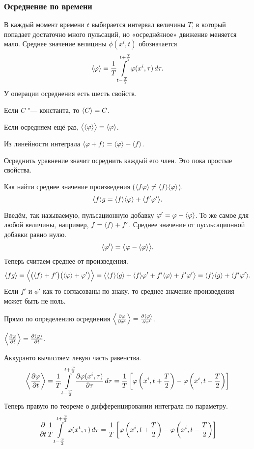 \subsubsection{Осреднение по времени}
В каждый момент времени $t$ выбирается интервал величины $T$, в который попадает достаточно много пульсаций, но «осреднённое» движение меняется мало.
Среднее значение велицины $\phi(x^i,t)$ обозначается
\[
\la \phi\ra = \frac1T\int\limits_{t-\frac T2}^{t+\frac T2}\phi(x^i,\tau)\,d\tau.
\]
У операции осреднения есть шесть свойств.
\begin{Ut}
  Если $C$ "--- константа, то $\la C\ra = C$.
\end{Ut}
\begin{Ut}
 Если осредняем ещё раз, $\big\la\la\phi\ra\big\ra = \la \phi\ra$.
\end{Ut}
\begin{Ut}
  Из линейности интеграла $\la \phi+f\ra = \la \phi\ra + \la f\ra$.
\end{Ut}
Осреднить уравнение значит осреднить каждый его член. Это пока простые свойства. 
\begin{Ut}
  Как найти среднее значение произведения ($\la f\phi\ra\ne\la f\ra \la\phi\ra$).
\[
  \MID fg = \MID f\MID \phi + \MID{f'\phi'}.
\]
\end{Ut}
\begin{Proof}
  Введём, так называемую, пульсационную добавку $\phi' = \phi-\la\phi\ra$. То же самое для любой величины, например, $f = \la f\ra +f'$. Среднее значение от пусльсационной добавки равно нулю.
\[
  \la \phi'\ra = \big\la \phi - \la \phi\ra\big\ra.
\]
Теперь считаем среднее от произведения.
\[
  \la fg\ra = \Big\la \big(\la f\ra + f'\big)\big(\la \phi\ra + \phi'\big)\Big\ra = 
 \big\la \MID f \MID g + \MID f \phi' + f'\MID \phi + f'\phi'\big\ra =
  \MID f\MID g + \MID{f'\phi'}.
\]
Если $f'$ и $\phi'$ как-то согласованы по знаку, то среднее значение произведения может быть не ноль.
\end{Proof}
\begin{Ut}
  Прямо по определению осреднения $\MID[\Big]{\CP\phi{x^i}} = \CP{\MID\phi}{x^i}$.
\end{Ut}
\begin{Ut}
  $\MID[\Big]{\CP\phi t} = \CP{\MID\phi}t$.
\end{Ut}
\begin{Proof}
  Аккуранто вычисляем левую часть равенства.
\[
  \MID[\bigg]{\CP\phi t} = \iMID T\CP{\phi(x^i,\tau)}\tau\,d\tau = 
  \frac 1T\left[\phi\left(x^i,t+\frac T2\right) - \phi\left(x^i,t-\frac T2\right)\right]
\]
Теперь правую по теореме о дифференцировании интеграла по параметру.
\[
  \CP{ }t\iMID T\phi(x^t,\tau)\,d\tau =
  \frac 1T\left[\phi\left(x^i,t+\frac T2\right) - \phi\left(x^i,t-\frac T2\right)\right]
\]
\end{Proof}
